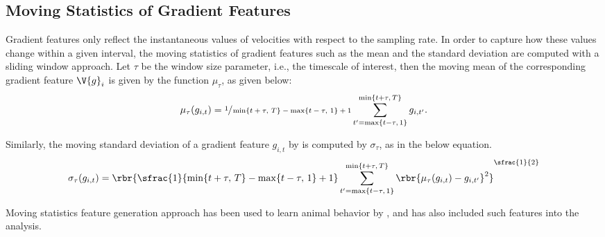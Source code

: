 \subsection{Moving Statistics of Gradient Features}
Gradient features only reflect the instantaneous values of velocities with respect to the sampling rate.
In order to capture how these values change within a given interval, the moving statistics of gradient features such as the mean and the standard deviation are  computed with a sliding window approach.
Let $\tau$ be the window size parameter, i.e., the timescale of interest, then the moving mean of the corresponding gradient feature $\V{g}_{i}$ is given by the function $\mu_\tau$, as given below:
\begin{equation}
	\mu_{\tau}(g_{i,t}) = \sfrac{1}{\min\{t+\tau,\, T\}-\max\{t-\tau,\, 1\}+1} \sum_{t^{\prime}=\max\{t-\tau,\, 1\}}^{\min\{t+\tau,\, T\}} g_{i, t^{\prime}}.
\end{equation}

Similarly, the moving standard deviation of a gradient feature $g_{i,t}$ by is computed by $\sigma_\tau$, as in the below equation.
\begin{equation}
	\sigma_\tau(g_{i,t}) = \rbr{\sfrac{1}{\min\{t+\tau,\, T\}-\max\{t-\tau,\, 1\}+1} \sum_{t^{\prime}=\max\{t-\tau,\, 1\}}^{\min\{t+\tau,\, T\}} \rbr{\mu_{\tau}(g_{i,t}) - g_{i, t^{\prime}}}^2}^{\sfrac{1}{2}}
\end{equation}

Moving statistics feature generation approach has been used to learn animal behavior by \citet{kabra_jaaba_2013}, and \citet{marshall_continuous_2021} has also included such features into the analysis.

